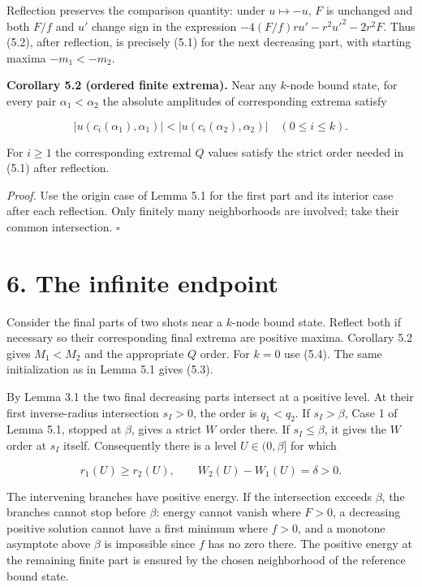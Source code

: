 \documentclass[11pt]{article}
\begin{document}
Reflection preserves the comparison quantity: under \(u\mapsto-u\),
\(F\) is unchanged and both \(F/f\) and \(u'\) change sign in the
expression \(-4(F/f)ru'-r^2u'^2-2r^2F\). Thus (5.2), after reflection,
is precisely (5.1) for the next decreasing part, with starting maxima
\(-m_1<-m_2\).

\textbf{Corollary 5.2 (ordered finite extrema).} Near any \(k\)-node
bound state, for every pair \(\alpha_1<\alpha_2\) the absolute
amplitudes of corresponding extrema satisfy

\[|u(c_i(\alpha_1),\alpha_1)|<|u(c_i(\alpha_2),\alpha_2)|\quad(0\leq i\leq k).\]

For \(i\geq1\) the corresponding extremal \(Q\) values satisfy the
strict order needed in (5.1) after reflection.

\emph{Proof.} Use the origin case of Lemma 5.1 for the first part and
its interior case after each reflection. Only finitely many
neighborhoods are involved; take their common intersection. \(\square\)

\section{6. The infinite endpoint}\label{the-infinite-endpoint}

Consider the final parts of two shots near a \(k\)-node bound state.
Reflect both if necessary so their corresponding final extrema are
positive maxima. Corollary 5.2 gives \(M_1<M_2\) and the appropriate
\(Q\) order. For \(k=0\) use (5.4). The same initialization as in Lemma
5.1 gives (5.3).

By Lemma 3.1 the two final decreasing parts intersect at a positive
level. At their first inverse-radius intersection \(s_I>0\), the order
is \(q_1<q_2\). If \(s_I>\beta\), Case 1 of Lemma 5.1, stopped at
\(\beta\), gives a strict \(W\) order there. If \(s_I\leq\beta\), it
gives the \(W\) order at \(s_I\) itself. Consequently there is a level
\(U\in(0,\beta]\) for which

\[r_1(U)\geq r_2(U),\qquad W_2(U)-W_1(U)=\delta>0. \tag{6.1}\]

The intervening branches have positive energy. If the intersection
exceeds \(\beta\), the branches cannot stop before \(\beta\): energy
cannot vanish where \(F>0\), a decreasing positive solution cannot have
a first minimum where \(f>0\), and a monotone asymptote above \(\beta\)
is impossible since \(f\) has no zero there. The positive energy at the
remaining finite part is ensured by the chosen neighborhood of the
reference bound state.
\end{document}

